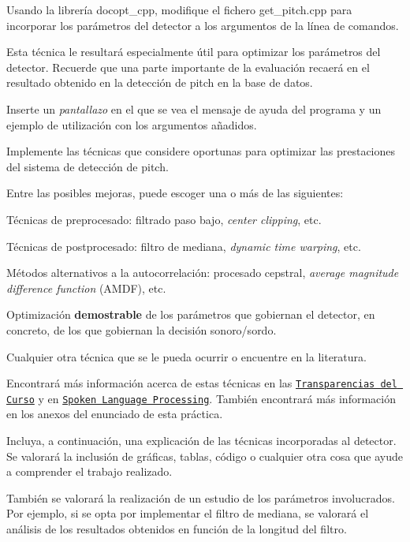 \begin{DoxyItemize}
\item Usando la librería {\ttfamily docopt\+\_\+cpp}, modifique el fichero {\ttfamily get\+\_\+pitch.\+cpp} para incorporar los parámetros del detector a los argumentos de la línea de comandos.

Esta técnica le resultará especialmente útil para optimizar los parámetros del detector. Recuerde que una parte importante de la evaluación recaerá en el resultado obtenido en la detección de pitch en la base de datos.
\begin{DoxyItemize}
\item Inserte un {\itshape pantallazo} en el que se vea el mensaje de ayuda del programa y un ejemplo de utilización con los argumentos añadidos.
\end{DoxyItemize}
\item Implemente las técnicas que considere oportunas para optimizar las prestaciones del sistema de detección de pitch.

Entre las posibles mejoras, puede escoger una o más de las siguientes\+:
\begin{DoxyItemize}
\item Técnicas de preprocesado\+: filtrado paso bajo, {\itshape center clipping}, etc.
\item Técnicas de postprocesado\+: filtro de mediana, {\itshape dynamic time warping}, etc.
\item Métodos alternativos a la autocorrelación\+: procesado cepstral, {\itshape average magnitude difference function} (A\+M\+DF), etc.
\item Optimización {\bfseries demostrable} de los parámetros que gobiernan el detector, en concreto, de los que gobiernan la decisión sonoro/sordo.
\item Cualquier otra técnica que se le pueda ocurrir o encuentre en la literatura.
\end{DoxyItemize}

Encontrará más información acerca de estas técnicas en las \href{https://atenea.upc.edu/pluginfile.php/2908770/mod_resource/content/3/2b_PS Techniques.pdf}{\tt Transparencias del Curso} y en \href{https://discovery.upc.edu/iii/encore/record/C__Rb1233593?lang=cat}{\tt Spoken Language Processing}. También encontrará más información en los anexos del enunciado de esta práctica.

Incluya, a continuación, una explicación de las técnicas incorporadas al detector. Se valorará la inclusión de gráficas, tablas, código o cualquier otra cosa que ayude a comprender el trabajo realizado.

También se valorará la realización de un estudio de los parámetros involucrados. Por ejemplo, si se opta por implementar el filtro de mediana, se valorará el análisis de los resultados obtenidos en función de la longitud del filtro.
\end{DoxyItemize}

